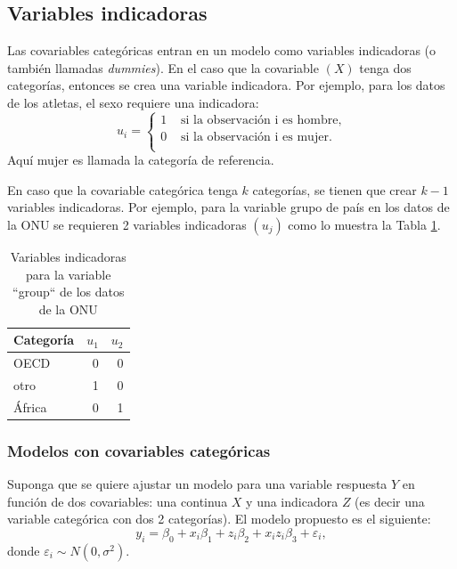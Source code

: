 \documentclass[
]{article}
\begin{document}
\hypertarget{variables-indicadoras}{%
\subsection{Variables indicadoras}\label{variables-indicadoras}}

Las covariables categóricas entran en un modelo como variables indicadoras (o también llamadas \emph{dummies}). En el caso que la covariable \((X)\) tenga dos categorías, entonces se crea una variable indicadora. Por ejemplo, para los datos de los atletas, el sexo requiere una indicadora:
\[
u_{i} = \begin{cases}
1 & \mbox{ si la observación i es hombre}, \\
0 & \mbox{ si la observación i es mujer}. \\
\end{cases}
\]
Aquí mujer es llamada la categoría de referencia.

En caso que la covariable categórica tenga \(k\) categorías, se tienen que crear \(k-1\) variables indicadoras. Por ejemplo, para la variable grupo de país en los datos de la ONU se requieren 2 variables indicadoras \((u_{j})\) como lo muestra la Tabla \ref{tab:dosIndica}.

\begin{table}

\caption{\label{tab:dosIndica}Variables indicadoras para la variable ``group`` de los datos de la ONU}
\centering
\begin{tabular}[t]{lrr}
\toprule
Categoría & $u_{1}$ & $u_{2}$\\
\midrule
OECD & 0 & 0\\
otro & 1 & 0\\
África & 0 & 1\\
\bottomrule
\end{tabular}
\end{table}

\hypertarget{modelos-con-covariables-categuxf3ricas}{%
\subsubsection{Modelos con covariables categóricas}\label{modelos-con-covariables-categuxf3ricas}}

Suponga que se quiere ajustar un modelo para una variable respuesta \(Y\) en función de dos covariables: una continua \(X\) y una indicadora \(Z\) (es decir una variable categórica con dos 2 categorías). El modelo propuesto es el siguiente:
\begin{equation}
y_{i}  = \beta_{0} + x_{i}\beta_{1} + z_{i}\beta_{2} + x_{i}z_{i}\beta_{3} + \varepsilon_{i},
\label{eq:modInter}
\end{equation}
donde \(\varepsilon_{i} \sim N(0,\sigma^{2})\).
\end{document}
